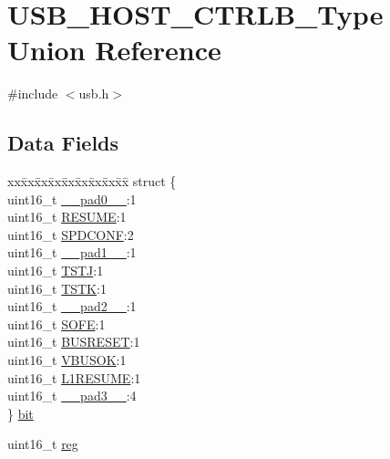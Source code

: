 \hypertarget{union_u_s_b___h_o_s_t___c_t_r_l_b___type}{}\section{U\+S\+B\+\_\+\+H\+O\+S\+T\+\_\+\+C\+T\+R\+L\+B\+\_\+\+Type Union Reference}
\label{union_u_s_b___h_o_s_t___c_t_r_l_b___type}


{\ttfamily \#include $<$usb.\+h$>$}

\subsection*{Data Fields}
\begin{DoxyCompactItemize}
\item 
\begin{tabbing}
xx\=xx\=xx\=xx\=xx\=xx\=xx\=xx\=xx\=\kill
struct \{\\
\>uint16\_t \mbox{\hyperlink{union_u_s_b___h_o_s_t___c_t_r_l_b___type_a77132c2c26a75f5b8751b235cda23828}{\_\_pad0\_\_}}:1\\
\>uint16\_t \mbox{\hyperlink{union_u_s_b___h_o_s_t___c_t_r_l_b___type_ad566e1f413a6dbf2e174563c0bb28bd7}{RESUME}}:1\\
\>uint16\_t \mbox{\hyperlink{union_u_s_b___h_o_s_t___c_t_r_l_b___type_a390a52aee14f964d6771fce88855d682}{SPDCONF}}:2\\
\>uint16\_t \mbox{\hyperlink{union_u_s_b___h_o_s_t___c_t_r_l_b___type_ab72e3a1f2f7db8695c60c658f5a0f11a}{\_\_pad1\_\_}}:1\\
\>uint16\_t \mbox{\hyperlink{union_u_s_b___h_o_s_t___c_t_r_l_b___type_a93ebd73b77f14261ceea0868eabbba4c}{TSTJ}}:1\\
\>uint16\_t \mbox{\hyperlink{union_u_s_b___h_o_s_t___c_t_r_l_b___type_a99db242eb0068c623d4fa3bff4698d3d}{TSTK}}:1\\
\>uint16\_t \mbox{\hyperlink{union_u_s_b___h_o_s_t___c_t_r_l_b___type_a82701c5ec65a0fca9a84d8edc46a8192}{\_\_pad2\_\_}}:1\\
\>uint16\_t \mbox{\hyperlink{union_u_s_b___h_o_s_t___c_t_r_l_b___type_ae02affed24d33c0b0b1a6bc36702589a}{SOFE}}:1\\
\>uint16\_t \mbox{\hyperlink{union_u_s_b___h_o_s_t___c_t_r_l_b___type_a8a7582fae9e4c7fb559e4cc3142ae703}{BUSRESET}}:1\\
\>uint16\_t \mbox{\hyperlink{union_u_s_b___h_o_s_t___c_t_r_l_b___type_a7879561f4a609a31610f19055626bd1c}{VBUSOK}}:1\\
\>uint16\_t \mbox{\hyperlink{union_u_s_b___h_o_s_t___c_t_r_l_b___type_aac3e26c7c9d2e2d12f2b4ba2aa63732b}{L1RESUME}}:1\\
\>uint16\_t \mbox{\hyperlink{union_u_s_b___h_o_s_t___c_t_r_l_b___type_a1b0a1a9de051f3174325808d959500f7}{\_\_pad3\_\_}}:4\\
\} \mbox{\hyperlink{union_u_s_b___h_o_s_t___c_t_r_l_b___type_a4e131ee623720bf7e713f4880adf8807}{bit}}\\

\end{tabbing}\item 
uint16\+\_\+t \mbox{\hyperlink{union_u_s_b___h_o_s_t___c_t_r_l_b___type_a11760f5020019f4aa8cb02e694f7cc44}{reg}}
\end{DoxyCompactItemize}


